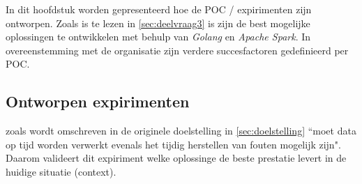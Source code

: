 


In dit hoofdstuk worden gepresenteerd hoe de POC / expirimenten zijn ontworpen. Zoals is te lezen in \ref{sec:deelvraag3} is zijn de best mogelijke oplossingen te ontwikkelen met behulp van \textit{Golang} en \textit{Apache Spark}. In overeenstemming met de organisatie zijn verdere succesfactoren gedefinieerd per POC.




\subsection{Ontworpen expirimenten}

zoals wordt omschreven in de originele doelstelling in \ref{sec:doelstelling} ``moet data op tijd worden verwerkt evenals het tijdig herstellen van fouten mogelijk zijn".  Daarom valideert dit expiriment welke oplossinge de beste prestatie levert in de huidige situatie (context).

